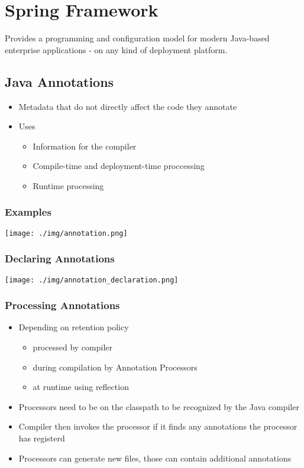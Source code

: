 
\section{Spring Framework}
Provides a programming and configuration model for modern Java-based enterprise applications - on any kind of deployment platform.

\subsection{Java Annotations}
\begin{itemize}
    \item Metadata that do not directly affect the code they annotate
    \item Uses
    \begin{itemize}
        \item Information for the compiler
        \item Compile-time and deployment-time proccessing
        \item Runtime processing
    \end{itemize}
\end{itemize}
\subsubsection{Examples}
\texttt{[image: ./img/annotation.png]}
\subsubsection{Declaring Annotations}
\texttt{[image: ./img/annotation\_declaration.png]}
\subsubsection{Processing Annotations}
\begin{itemize}
    \item Depending on retention policy
    \begin{itemize}
        \item processed by compiler
        \item during compilation by Annotation Processors
        \item at runtime using reflection
    \end{itemize}
    \item Processors need to be on the classpath to be recognized by the Java compiler
    \item Compiler then invokes the processor if it finds any annotations the processor has registerd
    \item Processors can generate new files, those can contain additional annotations
\end{itemize}

